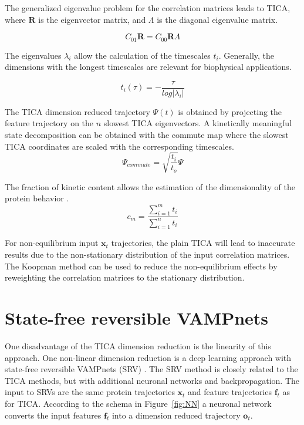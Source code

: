 The generalized eigenvalue problem for the correlation matrices leads to TICA, where $\mathbf{R}$ is the eigenvector matrix, and $\mathbf{\varLambda}$ is the diagonal eigenvalue matrix. 

$$C_{01}\mathbf{R}=C_{00}\mathbf{R}\mathbf{\varLambda}$$

The eigenvalues $\lambda_{i}$ allow the calculation of the timescales $t_{i}$. Generally, the dimensions with the longest timescales are relevant for biophysical applications.

$$t_{i}(\tau)=-\frac{\tau}{log\left|\lambda_{i}\right|}$$ 

The TICA dimension reduced trajectory $\varPsi(t)$ is obtained by projecting the feature trajectory on the $n$ slowest TICA eigenvectors. A kinetically meaningful state decomposition can be obtained with the commute map\cite{noe2016commute} where the slowest TICA coordinates are scaled with the corresponding timescales.
$$\varPsi_{commute}=\sqrt{\frac{t_{i}}{t_{o}}}\varPsi$$

The fraction of kinetic content allows the estimation of the dimensionality of the protein behavior \cite{noe2016commute}.
$$c_{m}=\frac{\sum_{i=1}^{m}t_{i}}{\sum_{i=1}^{n}t_{i}}$$

For non-equilibrium input $\mathbf{x}_{t}$ trajectories, the plain TICA will lead to inaccurate results due to the non-stationary distribution of the input correlation matrices. The Koopman method \cite{koopmanold,
koopman2,koopman3,koopman4, wu2017variational, Nueske2017} can be used to reduce
the non-equilibrium effects by reweighting the correlation matrices to the stationary distribution.

\section{State-free reversible VAMPnets}

One disadvantage of the TICA dimension reduction is the linearity of this approach. One non-linear dimension reduction is a deep learning approach with state-free reversible VAMPnets (SRV) \cite{Mardt2018,chen2019jcp}. The SRV method is closely related to the TICA methods, but with additional neuronal networks and backpropagation. The input to SRVs are the same protein trajectories $\mathbf{x}_{t}$ and feature trajectories $\mathbf{f}_{t}$ as for TICA. According to the schema in Figure~\ref{fig:NN} a neuronal network converts the input features $\mathbf{f}_{t}$ into a dimension reduced trajectory $\mathbf{o}_{t}$.

